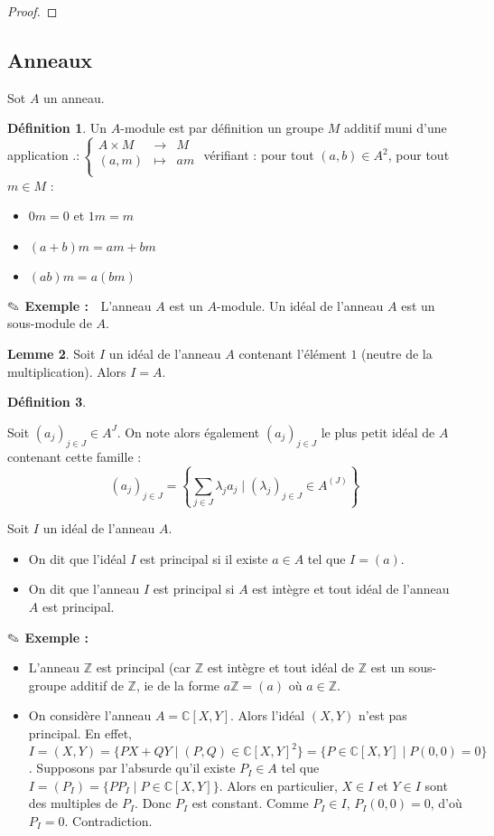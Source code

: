 \documentclass{report}
\newcommand{\Z}{\mathbb{Z}}
\newcommand{\C}{\mathbb{C}}
\newcommand{\dis}{\displaystyle}
\theoremstyle{definition}
\newtheorem{defi}{Définition}[chapter]
\newtheorem{lem}[defi]{Lemme}
\newcommand{\exem}{{\textbf{$\text{\ding{46}}$ Exemple : \ }}}
\newcommand{\app}[5]{#1:\left\{\begin{array}{ccl}
#2 & \longrightarrow & #3 \\
#4 & \longmapsto & #5  \\
\end{array}\right.
}
\begin{document}
\begin{proof}

\end{proof}

\subsection{Anneaux}

Sot $A$ un anneau.

\begin{defi}
Un $A$-module est par définition un groupe $M$ additif muni d'une application $\app{.}{A \times M}{M}{(a,m)}{am}$ vérifiant : pour tout $(a,b) \in A^2$, pour tout $m \in M$ :
\begin{itemize}
\item $0m=0$ et $1m=m$
\item $(a+b)m=am+bm$
\item $(ab)m=a(bm)$
\end{itemize}
\end{defi}

\exem L'anneau $A$ est un $A$-module. Un idéal de l'anneau $A$ est un sous-module de $A$. 

\begin{lem}
Soit $I$ un idéal de l'anneau $A$ contenant l'élément $1$ (neutre de la multiplication). Alors $I=A$.
\end{lem}

\begin{defi}
\begin{point}
\item Soit $(a_j)_{j\in J} \in A^J$. On note alors également $ (a_j)_{j\in J}$ le plus petit idéal de $A$ contenant cette famille : \[(a_j)_{j\in J}=\left\{\dis \sum_{j \in J} \lambda_ja_j \mid (\lambda_j)_{j\in J} \in A^{(J)}  \right\} \]
\item Soit $I$ un idéal de l'anneau $A$. 
\begin{itemize}
\item On dit que l'idéal $I$ est principal si il existe $a \in A$ tel que $I=(a)$.
\item On dit que l'anneau $I$ est principal si $A$ est intègre et tout idéal de l'anneau $A$ est principal.
\end{itemize} 
\end{point}
\end{defi}

\exem 
\begin{itemize}
\item L'anneau $\Z$ est principal (car $\Z$ est intègre et tout idéal de $\Z$ est un sous-groupe additif de $\Z$, ie de la forme $a\Z=(a)$ où $a\in \Z$.
\item On considère l'anneau $A=\C[X,Y]$. Alors l'idéal $(X,Y)$ n'est pas principal. En effet, $I=(X,Y)=\{PX+QY \mid (P,Q) \in \C[X,Y]^2\}=\{P \in \C[X,Y] \mid P(0,0)=0\}$. Supposons par l'absurde qu'il existe $P_I \in A$ tel que $I=(P_I)=\{PP_I \mid P \in \C[X,Y]\}$. Alors en particulier, $X \in I$ et $Y\in I$ sont des multiples de $P_I$. Donc $P_I$ est constant. Comme $P_I \in I$, $P_I(0,0)=0$, d'où $P_I=0$. Contradiction.
\end{itemize}
\end{document}

